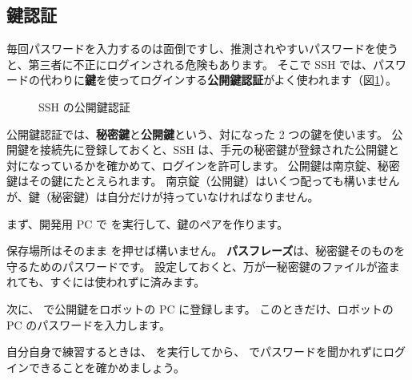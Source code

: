 \subsection{鍵認証}

毎回パスワードを入力するのは面倒ですし、推測されやすいパスワードを使うと、第三者に不正にログインされる危険もあります。
そこで SSH では、パスワードの代わりに\textbf{鍵}を使ってログインする\textbf{公開鍵認証}がよく使われます（図\ref{fig:network-ssh-key}）。

\begin{figure}[tb]
  \centering
  
  \caption{SSH の公開鍵認証}
  \label{fig:network-ssh-key}
\end{figure}

公開鍵認証では、\textbf{秘密鍵}と\textbf{公開鍵}という、対になった 2 つの鍵を使います。
公開鍵を接続先に登録しておくと、SSH は、手元の秘密鍵が登録された公開鍵と対になっているかを確かめて、ログインを許可します。
公開鍵は南京錠、秘密鍵はその鍵にたとえられます。
南京錠（公開鍵）はいくつ配っても構いませんが、鍵（秘密鍵）は自分だけが持っていなければなりません。

まず、開発用 PC で  を実行して、鍵のペアを作ります。


保存場所はそのまま  を押せば構いません。
\textbf{パスフレーズ}は、秘密鍵そのものを守るためのパスワードです。
設定しておくと、万が一秘密鍵のファイルが盗まれても、すぐには使われずに済みます。

次に、 で公開鍵をロボットの PC に登録します。
このときだけ、ロボットの PC のパスワードを入力します。


自分自身で練習するときは、 を実行してから、 でパスワードを聞かれずにログインできることを確かめましょう。


